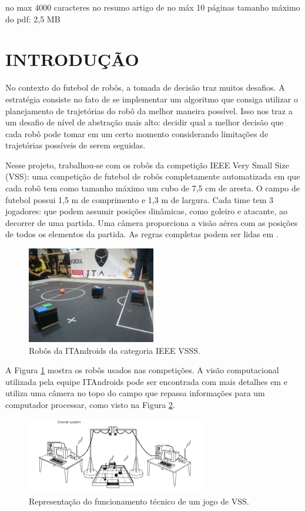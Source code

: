 \documentclass[10pt,fleqn,a4paper]{article}
\begin{document}
no max 4000 caracteres no resumo
artigo de no máx 10 páginas
tamanho máximo do pdf: 2,5 MB
    \section{INTRODUÇÃO}
        	
	No contexto do futebol de robôs, a tomada de decisão traz muitos desafios. A estratégia consiste no fato de se implementar um algoritmo que consiga utilizar o planejamento de trajetórias do robô da melhor maneira possível. Isso nos traz a um desafio de nível de abstração mais alto: decidir qual a melhor decisão que cada robô pode tomar em um certo momento considerando limitações de trajetórias possíveis de serem seguidas.

	Nesse projeto, trabalhou-se com os robôs da competição IEEE Very Small Size (VSS): uma competição de futebol de robôs completamente automatizada em que cada robô tem como tamanho máximo um cubo de 7,5 cm de aresta. O campo de futebol possui 1,5 m de comprimento e 1,3 m de largura. Cada time tem 3 jogadores: que podem assumir posições dinâmicas, como goleiro e atacante, ao decorrer de uma partida. Uma câmera proporciona a visão aérea com as posições de todos os elementos da partida. As regras completas podem ser lidas em \cite{CBR2008}.

\begin{figure}[H]
	\centering
	\includegraphics[width=0.5\textwidth]{figures/vss.JPG}
   \caption{Robôs da ITAndroids da categoria IEEE VSSS.} \label{fig:vss}
\end{figure}

	A Figura \ref{fig:vss} mostra os robôs usados nas competições. A visão computacional utilizada pela equipe ITAndroids pode ser encontrada com mais detalhes em \cite{tasinaffo_ic} e utiliza uma câmera no topo do campo que repassa informações para um computador processar, como visto na Figura \ref{fig:funcioamento}.

\begin{figure}[H]
	\centering
		\includegraphics[width=0.7\textwidth]{figures/overview.png}
  \caption{Representação do funcionamento técnico de um jogo de VSS.}
	\label{fig:funcioamento}
\end{figure}
\end{document}
